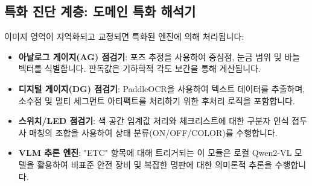 \subsection{특화 진단 계층: 도메인 특화 해석기}
이미지 영역이 지역화되고 교정되면 특화된 엔진에 의해 처리됩니다:
\begin{itemize}
    \item \textbf{아날로그 게이지(AG) 점검기}: 포즈 추정을 사용하여 중심점, 눈금 범위 및 바늘 벡터를 식별합니다. 판독값은 기하학적 각도 보간을 통해 계산됩니다.
    \item \textbf{디지털 게이지(DG) 점검기}: PaddleOCR을 사용하여 텍스트 데이터를 추출하며, 소수점 및 멀티 세그먼트 아티팩트를 처리하기 위한 후처리 로직을 포함합니다.
    \item \textbf{스위치/LED 점검기}: 색 공간 임계값 처리와 체크리스트에 대한 구분자 인식 접두사 매칭의 조합을 사용하여 상태 분류(ON/OFF/COLOR)를 수행합니다.
    \item \textbf{VLM 추론 엔진}: "ETC" 항목에 대해 트리거되는 이 모듈은 로컬 Qwen2-VL 모델을 활용하여 비표준 안전 장비 및 복잡한 명판에 대한 의미론적 추론을 수행합니다.
\end{itemize}

